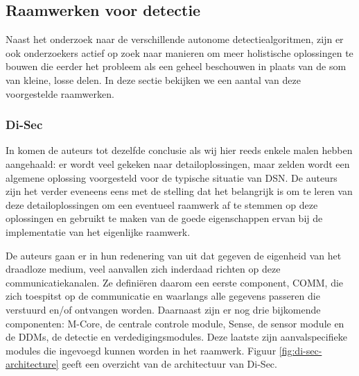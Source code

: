 
\subsection{Raamwerken voor detectie}
\label{subsection:frameworks}

Naast het onderzoek naar de verschillende autonome detectiealgoritmen, zijn er
ook onderzoekers actief op zoek naar manieren om meer holistische oplossingen
te bouwen die eerder het probleem als een geheel beschouwen in plaats van de
som van kleine, losse delen. In deze sectie bekijken we een aantal van deze
voorgestelde raamwerken.

\subsubsection*{Di-Sec}
\label{subsubsection:di-sec}

In \citep{valero2012di} komen de auteurs tot dezelfde conclusie als wij hier
reeds enkele malen hebben aangehaald: er wordt veel gekeken naar
detailoplossingen, maar zelden wordt een algemene oplossing voorgesteld voor de
typische situatie van DSN. De auteurs zijn het verder eveneens eens met de
stelling dat het belangrijk is om te leren van deze detailoplossingen om een
eventueel raamwerk af te stemmen op deze oplossingen en gebruikt te maken van
de goede eigenschappen ervan bij de implementatie van het eigenlijke raamwerk.

De auteurs gaan er in hun redenering van uit dat gegeven de eigenheid van het
draadloze medium, veel aanvallen zich inderdaad richten op deze
communicatiekanalen. Ze defini\"eren daarom een eerste component, COMM, die
zich toespitst op de communicatie en waarlangs alle gegevens passeren die
verstuurd en/of ontvangen worden. Daarnaast zijn er nog drie bijkomende
componenten: M-Core, de centrale controle module, Sense, de sensor module en de
DDMs, de detectie en verdedigingsmodules. Deze laatste zijn aanvalspecifieke
modules die ingevoegd kunnen worden in het raamwerk. Figuur
\ref{fig:di-sec-architecture} geeft een overzicht van de architectuur van
Di-Sec.

